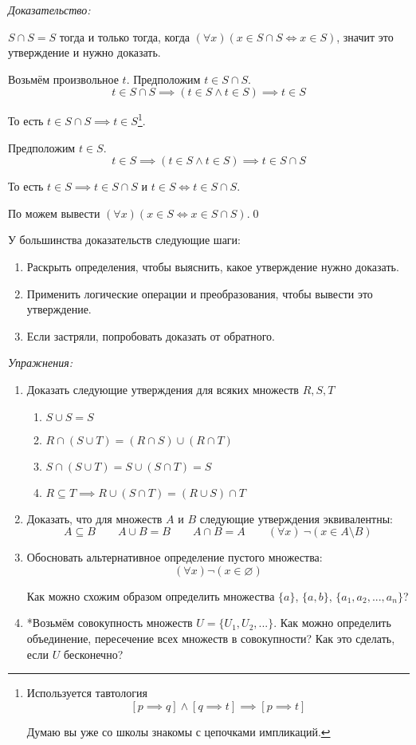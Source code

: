 {\it Доказательство:}

$S\cap S=S$ тогда и только
тогда, когда ${(\forall x)(x\in S\cap S\iff x\in S)}$,
значит это утверждение и нужно доказать.

Возьмём произвольное $t$. Предположим $t\in S\cap S$.
\[
	t\in S\cap S\implies (t\in S\land t\in S)\implies t\in S
\]

То есть $t\in S\cap S\implies t\in S$\footnote{Используется
	тавтология
	\[
		[p\implies q]\land[q\implies t]\implies [p\implies t]
	\]

	Думаю вы уже со школы знакомы с цепочками импликаций.
}.

Предположим $t\in S$.
\[
	t\in S\implies (t\in S\land t\in S)\implies t\in S\cap S
\]

То есть $t\in S\implies t\in S\cap S$ и $t\in S\iff t\in S\cap S$.

По \Aii{} можем вывести $(\forall x)(x\in S\iff x\in S\cap S)$.\qed

\pagebreak

У большинства доказательств следующие шаги:
\begin{enumerate}
	\item{}Раскрыть определения, чтобы выяснить, какое утверждение нужно доказать.
	\item{}Применить логические операции и преобразования, чтобы вывести это утверждение.
	\item{}Если застряли, попробовать доказать от обратного.
\end{enumerate}

{\it Упражнения:}
\begin{enumerate}
	\item{}Доказать следующие утверждения для всяких множеств $R,S,T$
	\begin{enumerate}
		\item{}$S\cup S=S$
		\item{}$R\cap (S\cup T)=(R\cap S)\cup (R\cap T)$
		\item{}$S\cap (S\cup T)=S\cup (S\cap T)=S$
		\item{}$R\subseteq T\implies R\cup (S\cap T)=(R\cup S)\cap T$
	\end{enumerate}

	\item{}Доказать, что для множеств $A$ и $B$ следующие утверждения эквивалентны:
	\[
		A\subseteq B\qquad A\cup B=B\qquad A\cap B=A
		\qquad (\forall x)~\lnot(x\in A\setminus B)
	\]
	\item{}Обосновать альтернативное определение пустого множества:
	\[
		(\forall x)\lnot(x\in \varnothing)
	\]

	Как можно схожим образом определить множества $\{a\}$, $\{a,b\}$,
	$\{a_1,a_2,...,a_{n}\}$?
	\item{}*Возьмём совокупность множеств $U=\{U_{1},U_{2},...\}$.
	Как можно определить объединение, пересечение всех множеств в совокупности?
	Как это сделать, если $U$ бесконечно?
\end{enumerate}

